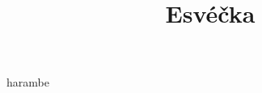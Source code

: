 \documentclass{article}
\title{\vspace{-2cm}Esvéčka\vspace{-1.7cm}}
\date{}
\author{}
\begin{document}
\maketitle

harambe
\end{document}

